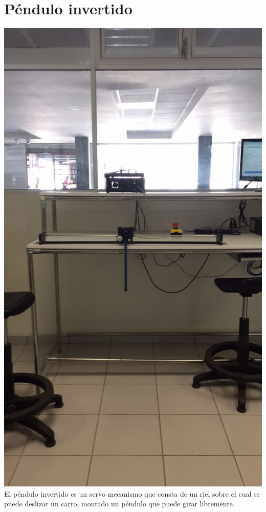 \documentclass[12pt,a4paper]{book}
\begin{document}
\newpage

\section{Péndulo invertido}
\includegraphics[scale=.25]{./1.jpeg}
\\ El péndulo invertido es un servo mecanismo que consta de un riel sobre
el cual se puede deslizar un carro, montado un péndulo que
puede girar libremente. 
\\
\end{document}
